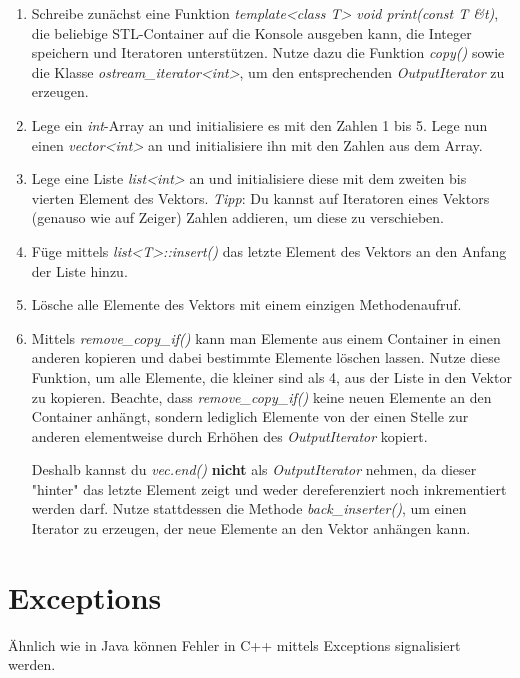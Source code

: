 \begin{enumerate}
\item 
Schreibe zunächst eine Funktion \emph{template<class T> void print(const T \&t)}, die beliebige STL-Container auf die Konsole ausgeben kann, die Integer speichern und Iteratoren unterstützen.
Nutze dazu die Funktion \emph{copy()} sowie die Klasse \emph{ostream\_iterator<int>}, um den entsprechenden \emph{OutputIterator} zu erzeugen.

\item
Lege ein \emph{int}-Array an und initialisiere es mit den Zahlen 1 bis 5.
Lege nun einen \emph{vector<int>} an und initialisiere ihn mit den Zahlen aus dem Array.

\item
Lege eine Liste \emph{list<int>} an und initialisiere diese mit dem zweiten bis vierten Element des Vektors.
\emph{Tipp}: Du kannst auf Iteratoren eines Vektors (genauso wie auf Zeiger) Zahlen addieren, um diese zu verschieben.

\item
Füge mittels \emph{list<T>::insert()} das letzte Element des Vektors an den Anfang der Liste hinzu.

\item
Lösche alle Elemente des Vektors mit einem einzigen Methodenaufruf.

\item
Mittels \emph{remove\_copy\_if()} kann man Elemente aus einem Container in einen anderen kopieren und dabei bestimmte Elemente löschen lassen.
Nutze diese Funktion, um alle Elemente, die kleiner sind als 4, aus der Liste in den Vektor zu kopieren. Beachte, dass \emph{remove\_copy\_if()} keine neuen Elemente an den Container anhängt, sondern lediglich Elemente von der einen Stelle zur anderen elementweise durch Erhöhen des \emph{OutputIterator} kopiert.

Deshalb kannst du \emph{vec.end()} \textbf{nicht} als \emph{OutputIterator} nehmen, da dieser "{}hinter"{} das letzte Element zeigt und weder dereferenziert noch inkrementiert werden darf. Nutze stattdessen die Methode \emph{back\_inserter()}, um einen Iterator zu erzeugen, der neue Elemente an den Vektor anhängen kann.
\end{enumerate}

\section{Exceptions}
Ähnlich wie in Java können Fehler in C++ mittels Exceptions signalisiert werden.

